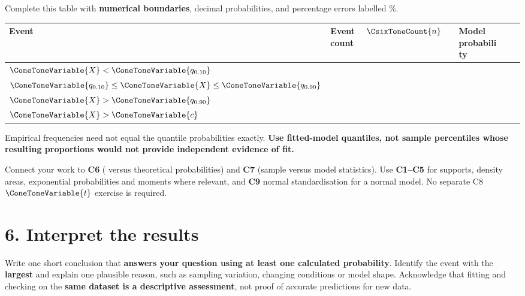 Complete this table with \textbf{numerical boundaries}, decimal probabilities, and percentage errors labelled $\%$.
\begin{center}
\small
\setlength{\tabcolsep}{3pt}
\renewcommand{\arraystretch}{1.2}
\begin{tabularx}{\textwidth}{|>{\raggedright\arraybackslash}X|C{1.5cm}|C{1.5cm}|C{2.2cm}|C{2.2cm}|C{1.9cm}|C{2.2cm}|}
\hline
\textbf{Event} & \textbf{Event count} & \textbf{  $\CsixToneCount{n}$} & \textbf{ } & \textbf{Model probability} & \textbf{ } & \textbf{ }\\\hline
$\ConeToneVariable{X}<\ConeToneVariable{q_{0.10}}$ & & & & & & \\\hline
$\ConeToneVariable{q_{0.10}}\le \ConeToneVariable{X}\le \ConeToneVariable{q_{0.90}}$ & & & & & & \\\hline
$\ConeToneVariable{X}>\ConeToneVariable{q_{0.90}}$ & & & & & & \\\hline
$\ConeToneVariable{X}>\ConeToneVariable{c}$ & & & & & & \\\hline
\end{tabularx}
\end{center}

Empirical frequencies need not equal the quantile probabilities exactly. \textbf{Use fitted-model quantiles, not sample percentiles whose resulting proportions would not provide independent evidence of fit.}

Connect your work to \textbf{C6} (  versus theoretical probabilities) and \textbf{C7} (sample versus model statistics). Use \textbf{C1--C5} for supports, density areas, exponential probabilities and moments where relevant, and \textbf{C9} normal standardisation for a normal model. No separate C8 $\ConeToneVariable{t}$ exercise is required.

\section*{6. Interpret the results}
Write one short conclusion that \textbf{answers your question using at least one calculated probability}. Identify the event with the \textbf{largest  } and explain one plausible reason, such as sampling variation, changing conditions or model shape. Acknowledge that fitting and checking on the \textbf{same dataset is a descriptive assessment}, not proof of accurate predictions for new data.

